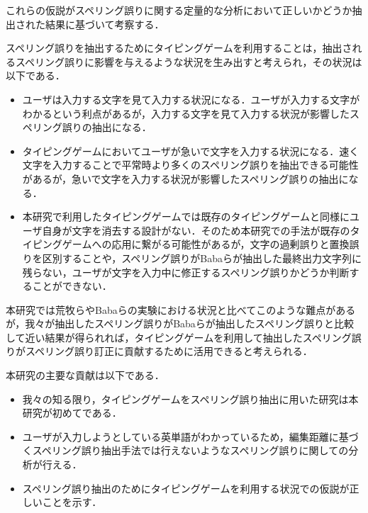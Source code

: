 これらの仮説がスペリング誤りに関する定量的な分析において正しいかどうか抽出された結果に基づいて考察する．

スペリング誤りを抽出するためにタイピングゲームを利用することは，抽出されるスペリング誤りに影響を与えるような状況を生み出すと考えられ，その状況は以下である．

\begin{itemize}
 \item ユーザは入力する文字を見て入力する状況になる．ユーザが入力する文字がわかるという利点があるが，入力する文字を見て入力する状況が影響したスペリング誤りの抽出になる．
 \item タイピングゲームにおいてユーザが急いで文字を入力する状況になる．速く文字を入力することで平常時より多くのスペリング誤りを抽出できる可能性があるが，急いで文字を入力する状況が影響したスペリング誤りの抽出になる．
 \item 本研究で利用したタイピングゲームでは既存のタイピングゲーム\cite{game}と同様にユーザ自身が文字を消去する設計がない．そのため本研究での手法が既存のタイピングゲームへの応用に繋がる可能性があるが，文字の過剰誤りと置換誤りを区別することや，スペリング誤りがBabaらが抽出した最終出力文字列に残らない，ユーザが文字を入力中に修正するスペリング誤り\cite{babaACL2012}かどうか判断することができない．
\end{itemize}

本研究では荒牧ら\cite{aramakiNLP2010}やBabaら\cite{babaACL2012}の実験における状況と比べてこのような難点があるが，我々が抽出したスペリング誤りがBabaらが抽出したスペリング誤りと比較して近い結果が得られれば，タイピングゲームを利用して抽出したスペリング誤りがスペリング誤り訂正に貢献するために活用できると考えられる．

本研究の主要な貢献は以下である．

\begin{itemize}
 \item 我々の知る限り，タイピングゲームをスペリング誤り抽出に用いた研究は本研究が初めてである．
 \item ユーザが入力しようとしている英単語がわかっているため，編集距離に基づくスペリング誤り抽出手法\cite{aramakiNLP2010}では行えないようなスペリング誤りに関しての分析が行える．
 \item スペリング誤り抽出のためにタイピングゲームを利用する状況での仮説が正しいことを示す．
\end{itemize}

